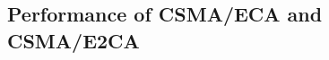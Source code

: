 \documentclass[journal]{IEEEtran}
\begin{document}
%
%
%

\subsection{Performance of CSMA/ECA and CSMA/E2CA}
\end{document}
